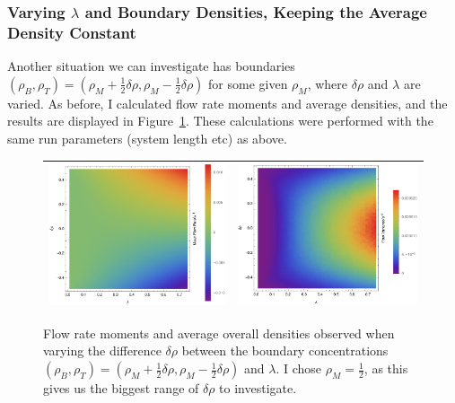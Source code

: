 \subsubsection{Varying $\lambda$ and Boundary Densities, Keeping the Average Density Constant}
Another situation we can investigate has boundaries $(\rho_B, \rho_T) = (\rho_M + \frac{1}{2} \delta\rho, \rho_M - \frac{1}{2} \delta\rho)$ for some given $\rho_M$, where $\delta\rho$ and $\lambda$ are varied. As before, I calculated flow rate
moments and average densities, and the results are displayed in Figure~\ref{fig:constDens}. These calculations were performed with the same run parameters (system length etc)
as above.

\begin{figure}[h!]
\vspace{1em}
\caption{\label{fig:constDens} Flow rate moments and average overall densities observed when varying the difference $\delta\rho$ between the boundary concentrations
$(\rho_B, \rho_T) = (\rho_M + \frac{1}{2} \delta\rho, \rho_M - \frac{1}{2} \delta\rho)$ and $\lambda$. I chose $\rho_M=\frac{1}{2}$, as this gives us the biggest range of $\delta\rho$ to investigate.}
\begin{center}
 \begin{tabular}{c|c}
    \includegraphics[width=0.5\linewidth]{../tex-src/images/constDens/meanFlow-crop} & \includegraphics[width=0.5\linewidth]{../tex-src/images/constDens/varFlow-crop} \\
    \hline

\end{tabular}
\end{center}
\end{figure}
